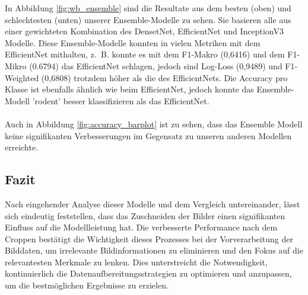 \documentclass{article}
\begin{document}
In Abbildung \ref{fig:wb_ensemble} sind die Resultate aus dem besten (oben) und schlechtesten (unten) unserer Ensemble-Modelle zu sehen. Sie basieren alle aus einer gewichteten Kombination des DensetNet, EfficientNet und InceptionV3 Modelle. Diese Ensemble-Modelle konnten in vielen Metriken mit dem EfficientNet mithalten, z. B. konnte es mit dem F1-Makro (0,6416) und dem F1-Mikro (0.6794) das EfficientNet schlagen, jedoch sind Log-Loss (0,9489) und F1-Weighted (0,6808) trotzdem höher als die des EfficientNets. Die Accuracy pro Klasse ist ebenfalls ähnlich wie beim EfficientNet, jedoch konnte das Ensemble-Modell 'rodent' besser klassifizieren als das EfficientNet.\\\\
Auch in Abbildung \ref{fig:accuracy_barplot} ist zu sehen, dass das Ensemble Modell keine signifikanten Verbesserungen im Gegensatz zu unseren anderen Modellen erreichte.

\subsection{Fazit}
Nach eingehender Analyse dieser Modelle und dem Vergleich untereinander, lässt sich eindeutig feststellen, dass das Zuschneiden der Bilder einen signifikanten Einfluss auf die Modellleistung hat. Die verbesserte Performance nach dem Croppen bestätigt die Wichtigkeit dieses Prozesses bei der Vorverarbeitung der Bilddaten, um irrelevante Bildinformationen zu eliminieren und den Fokus auf die relevantesten Merkmale zu lenken. Dies unterstreicht die Notwendigkeit, kontinuierlich die Datenaufbereitungsstrategien zu optimieren und anzupassen, um die bestmöglichen Ergebnisse zu erzielen.
\end{document}
